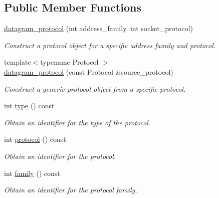 \subsection*{Public Member Functions}
\begin{DoxyCompactItemize}
\item 
\hyperlink{classasio_1_1generic_1_1datagram__protocol_aff9518b9e296409e4b1c8a7edb6483e2}{datagram\+\_\+protocol} (int address\+\_\+family, int socket\+\_\+protocol)
\begin{DoxyCompactList}\small\item\em Construct a protocol object for a specific address family and protocol. \end{DoxyCompactList}\item 
{\footnotesize template$<$typename Protocol $>$ }\\\hyperlink{classasio_1_1generic_1_1datagram__protocol_ae2a8ec323bd97b5feace8d683239abf3}{datagram\+\_\+protocol} (const Protocol \&source\+\_\+protocol)
\begin{DoxyCompactList}\small\item\em Construct a generic protocol object from a specific protocol. \end{DoxyCompactList}\item 
int \hyperlink{classasio_1_1generic_1_1datagram__protocol_a44d012cf0ec219a8ffbb7a7c48d4c6f0}{type} () const 
\begin{DoxyCompactList}\small\item\em Obtain an identifier for the type of the protocol. \end{DoxyCompactList}\item 
int \hyperlink{classasio_1_1generic_1_1datagram__protocol_abad31438891a7249879bf53ef07aa9b6}{protocol} () const 
\begin{DoxyCompactList}\small\item\em Obtain an identifier for the protocol. \end{DoxyCompactList}\item 
int \hyperlink{classasio_1_1generic_1_1datagram__protocol_aeb2f8b7b01adc29c19a837a144808f9c}{family} () const 
\begin{DoxyCompactList}\small\item\em Obtain an identifier for the protocol family. \end{DoxyCompactList}\end{DoxyCompactItemize}
